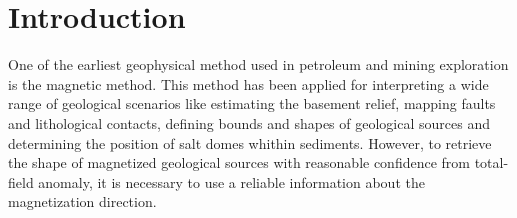 \section{Introduction}

One of the earliest geophysical method used in petroleum and mining exploration is the magnetic method. This method has been applied for interpreting a wide range of geological scenarios like estimating the basement relief, mapping faults and lithological contacts, defining bounds and shapes of geological sources and determining the position of salt domes whithin sediments. However, to retrieve the shape of magnetized geological sources with reasonable confidence from total-field anomaly, it is necessary to use a reliable information about the magnetization direction. 

